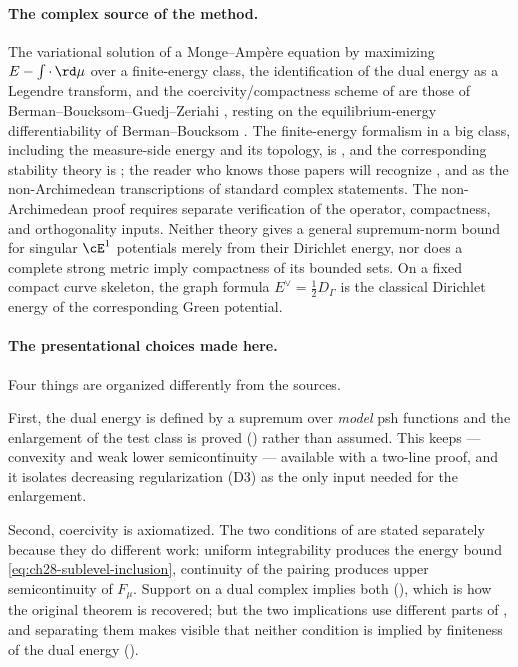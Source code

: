 \paragraph{The complex source of the method.}
The variational solution of a Monge--Amp\`ere equation by maximizing
$E-\int\cdot\,\rd\mu$ over a finite-energy class, the identification of the
dual energy as a Legendre transform, and the coercivity/compactness scheme of
 are those of Berman--Boucksom--Guedj--Zeriahi
\cite{BBGZ13}, resting on the equilibrium-energy differentiability of
Berman--Boucksom \cite{BB10}.  The finite-energy formalism in a big class,
including the measure-side energy and its topology, is \cite{BEGZ10}, and the
corresponding stability theory is \cite{BBEGZ16}; the reader who knows those
papers will recognize ,
 and  as
the non-Archimedean transcriptions of standard complex statements.  The non-Archimedean proof requires separate verification of the
operator, compactness, and orthogonality inputs.  Neither theory gives
a general supremum-norm bound for singular $\cE^1$ potentials merely
from their Dirichlet energy, nor does a complete strong metric imply
compactness of its bounded sets.  On a fixed compact curve skeleton,
the graph formula $E^\vee=\tfrac12D_\Gamma$ is the classical
Dirichlet energy of the corresponding Green potential.

\paragraph{The presentational choices made here.}
Four things are organized differently from the sources.

First, the dual energy is defined by a supremum over \emph{model} psh
functions and the enlargement of the test class is proved
() rather than assumed.  This keeps
 --- convexity and weak lower
semicontinuity --- available with a two-line proof, and it isolates
decreasing regularization \textup{(D3)} as the only input needed for the
enlargement.

Second, coercivity is axiomatized.  The two conditions of
 are stated separately because they do
different work: uniform integrability produces the energy bound
\eqref{eq:ch28-sublevel-inclusion}, continuity of the pairing produces upper
semicontinuity of $F_\mu$.  Support on a dual complex implies both
(), which is how the original theorem is
recovered; but the two implications use different parts of
, and separating them makes visible
that neither condition is implied by finiteness of the dual energy
().

